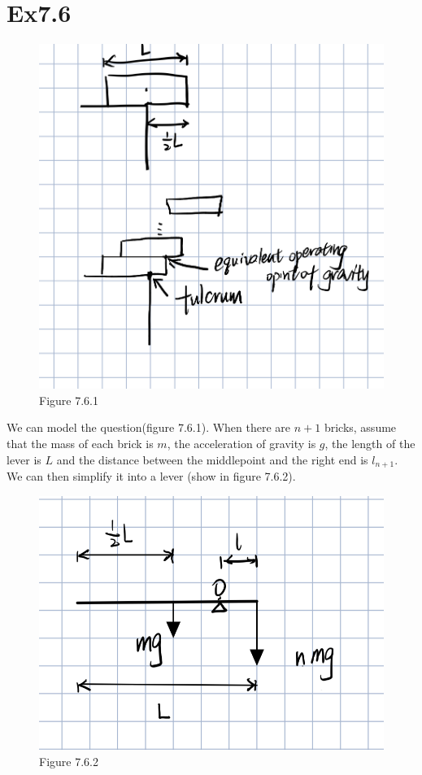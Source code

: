 \documentclass[11pt,twoside,a4paper]{article}
\begin{document}
\section{Ex7.6}
\begin{figure}[H]
    \centering
    \includegraphics[scale=0.5]{Ex7.6.1.png}
    \caption{Figure 7.6.1}
    \end{figure}
We can model the question(figure 7.6.1). When there are $n+1$ bricks,
 assume that the mass of each brick is $m$, the acceleration 
 of gravity is $g$, the length of the lever is $L$ and the 
 distance between the middlepoint and the right end is 
 $l_{n+1}$. We can then simplify it into a lever (show in figure 7.6.2).
\begin{figure}[H]
    \centering
    \includegraphics[scale=0.5]{Ex7.6.2.png}
    \caption{Figure 7.6.2}
    \end{figure}
\end{document}
